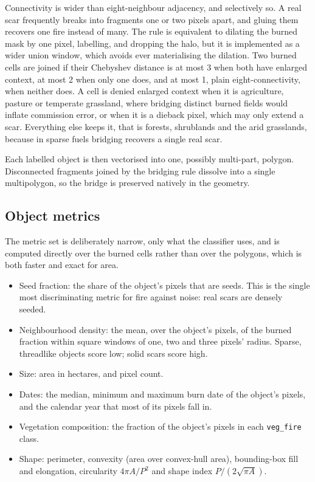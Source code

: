 \documentclass[11pt,a4paper]{article}
\begin{document}
Connectivity is wider than eight-neighbour adjacency, and selectively so. A real scar frequently
breaks into fragments one or two pixels apart, and gluing them recovers one fire instead of many.
The rule is equivalent to dilating the burned mask by one pixel, labelling, and dropping the halo,
but it is implemented as a wider union window, which avoids ever materialising the dilation. Two
burned cells are joined if their Chebyshev distance is at most 3 when both have enlarged context,
at most 2 when only one does, and at most 1, plain eight-connectivity, when neither does. A cell is
denied enlarged context when it is agriculture, pasture or temperate grassland, where bridging
distinct burned fields would inflate commission error, or when it is a dieback pixel, which may
only extend a scar. Everything else keeps it, that is forests, shrublands and the arid grasslands,
because in sparse fuels bridging recovers a single real scar.

Each labelled object is then vectorised into one, possibly multi-part, polygon. Disconnected
fragments joined by the bridging rule dissolve into a single multipolygon, so the bridge is
preserved natively in the geometry.

\subsection{Object metrics}\label{sec-objmetrics}

The metric set is deliberately narrow, only what the classifier uses, and is computed directly
over the burned cells rather than over the polygons, which is both faster and exact for area.

\begin{itemize}
  \item Seed fraction: the share of the object's pixels that are seeds. This is the single most
        discriminating metric for fire against noise: real scars are densely seeded.
  \item Neighbourhood density: the mean, over the object's pixels, of the burned fraction within
        square windows of one, two and three pixels' radius. Sparse, threadlike objects score low;
        solid scars score high.
  \item Size: area in hectares, and pixel count.
  \item Dates: the median, minimum and maximum burn date of the object's pixels, and the calendar
        year that most of its pixels fall in.
  \item Vegetation composition: the fraction of the object's pixels in each \texttt{veg\_fire}
        class.
  \item Shape: perimeter, convexity (area over convex-hull area), bounding-box fill and
        elongation, circularity \(4\pi A/P^2\) and shape index \(P/(2\sqrt{\pi A})\).
\end{itemize}
\end{document}
